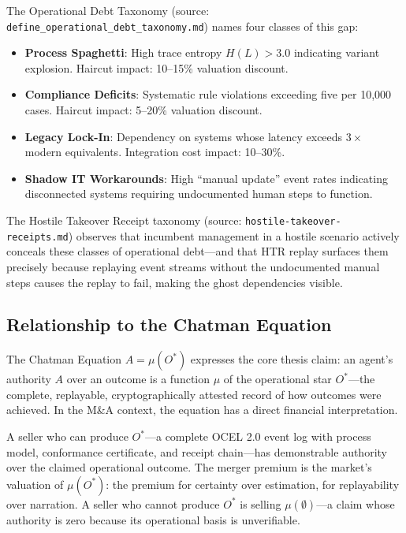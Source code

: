 The Operational Debt Taxonomy (source: \texttt{define\_operational\_debt\_taxonomy.md}) names
four classes of this gap:

\begin{itemize}
  \item \textbf{Process Spaghetti}: High trace entropy $H(L) > 3.0$ indicating variant
    explosion. Haircut impact: 10--15\% valuation discount.
  \item \textbf{Compliance Deficits}: Systematic rule violations exceeding five per 10,000
    cases. Haircut impact: 5--20\% valuation discount.
  \item \textbf{Legacy Lock-In}: Dependency on systems whose latency exceeds $3\times$ modern
    equivalents. Integration cost impact: 10--30\%.
  \item \textbf{Shadow IT Workarounds}: High ``manual update'' event rates indicating
    disconnected systems requiring undocumented human steps to function.
\end{itemize}

The Hostile Takeover Receipt taxonomy (source: \texttt{hostile-takeover-receipts.md}) observes
that incumbent management in a hostile scenario actively conceals these classes of operational
debt---and that HTR replay surfaces them precisely because replaying event streams without the
undocumented manual steps causes the replay to fail, making the ghost dependencies visible.

\subsection{Relationship to the Chatman Equation}
\label{sec:ma-lineage-chatman-equation}

The Chatman Equation $A = \mu(O^*)$ expresses the core thesis claim: an agent's authority $A$
over an outcome is a function $\mu$ of the operational star $O^*$---the complete, replayable,
cryptographically attested record of how outcomes were achieved. In the M\&A context, the
equation has a direct financial interpretation.

A seller who can produce $O^*$---a complete OCEL 2.0 event log with process model, conformance
certificate, and receipt chain---has demonstrable authority over the claimed operational outcome.
The merger premium is the market's valuation of $\mu(O^*)$: the premium for certainty over
estimation, for replayability over narration. A seller who cannot produce $O^*$ is selling
$\mu(\emptyset)$---a claim whose authority is zero because its operational basis is
unverifiable.

